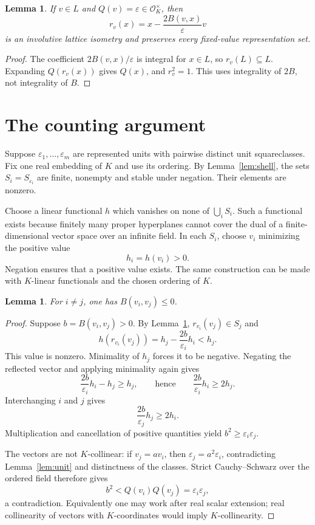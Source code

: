 \documentclass[11pt]{article}
\newtheorem{lemma}[theorem]{Lemma}
\newcommand{\OK}{\mathcal O_K}
\begin{document}
\begin{lemma}\label{lem:reflection}
If $v\in L$ and $Q(v)=\varepsilon\in\OK^\times$, then
\[
 r_v(x)=x-\frac{2B(v,x)}{\varepsilon}v
\]
is an involutive lattice isometry and preserves every fixed-value representation set.
\end{lemma}
\begin{proof}
The coefficient $2B(v,x)/\varepsilon$ is integral for $x\in L$, so $r_v(L)\subseteq L$. Expanding $Q(r_v(x))$ gives $Q(x)$, and $r_v^2=1$. This uses integrality of $2B$, not integrality of $B$.
\end{proof}

\section{The counting argument}
Suppose $\varepsilon_1,\ldots,\varepsilon_m$ are represented units with pairwise distinct unit squareclasses. Fix one real embedding of $K$ and use its ordering. By Lemma~\ref{lem:shell}, the sets $S_i=S_{\varepsilon_i}$ are finite, nonempty and stable under negation. Their elements are nonzero.

Choose a linear functional $h$ which vanishes on none of $\bigcup_i S_i$. Such a functional exists because finitely many proper hyperplanes cannot cover the dual of a finite-dimensional vector space over an infinite field. In each $S_i$, choose $v_i$ minimizing the positive value
\[
 h_i=h(v_i)>0.
\]
Negation ensures that a positive value exists. The same construction can be made with $K$-linear functionals and the chosen ordering of $K$.

\begin{lemma}\label{lem:obtuse}
For $i\ne j$, one has $B(v_i,v_j)\leq0$.
\end{lemma}
\begin{proof}
Suppose $b=B(v_i,v_j)>0$. By Lemma~\ref{lem:reflection}, $r_{v_i}(v_j)\in S_j$ and
\[
 h(r_{v_i}(v_j))=h_j-\frac{2b}{\varepsilon_i}h_i<h_j.
\]
This value is nonzero. Minimality of $h_j$ forces it to be negative. Negating the reflected vector and applying minimality again gives
\[
 \frac{2b}{\varepsilon_i}h_i-h_j\geq h_j,
 \qquad\text{hence}\qquad
 \frac{2b}{\varepsilon_i}h_i\geq2h_j.
\]
Interchanging $i$ and $j$ gives
\[
 \frac{2b}{\varepsilon_j}h_j\geq2h_i.
\]
Multiplication and cancellation of positive quantities yield $b^2\geq\varepsilon_i\varepsilon_j$.

The vectors are not $K$-collinear: if $v_j=a v_i$, then $\varepsilon_j=a^2\varepsilon_i$, contradicting Lemma~\ref{lem:unit} and distinctness of the classes. Strict Cauchy--Schwarz over the ordered field therefore gives
\[
 b^2<Q(v_i)Q(v_j)=\varepsilon_i\varepsilon_j,
\]
a contradiction. Equivalently one may work after real scalar extension; real collinearity of vectors with $K$-coordinates would imply $K$-collinearity.
\end{proof}
\end{document}
